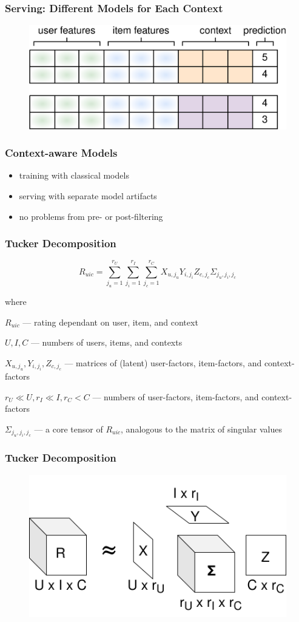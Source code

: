 \documentclass{beamer}
\begin{document}
\begin{frame}
  \frametitle{Serving: Different Models for Each Context}
  \begin{figure}
  \includegraphics[scale=0.25]{context-aware-3}
  \end{figure}
\end{frame}
\begin{frame}
  \frametitle{Context-aware Models}
  \begin{itemize}
  \item training with classical models
  \item serving with separate model artifacts
  \item no problems from pre- or post-filtering
  \end{itemize}
\end{frame}
\begin{frame}
  \frametitle{Tucker Decomposition}
$$R_{uic}=\sum\limits_{j_u=1}^{r_U}\sum\limits_{j_i=1}^{r_I}\sum\limits_{j_c=1}^{r_C}X_{u,j_u}Y_{i,j_i}Z_{c,j_c}\Sigma_{j_u,j_i,j_c}$$
  
  where

  $R_{uic}$ --- rating dependant on user, item, and context

  $U,I,C$ --- numbers of users, items, and contexts
  
  $X_{u,j_u},Y_{i,j_i},Z_{c,j_c}$ --- matrices of (latent) user-factors, item-factors, and context-factors

  $r_U\ll U,r_I\ll I,r_C<C$ --- numbers of user-factors, item-factors, and context-factors

  $\Sigma_{j_u,j_i,j_c}$ --- a core tensor of $R_{uic}$, analogous to the matrix of singular values
\end{frame}
\begin{frame}
  \frametitle{Tucker Decomposition}
  \begin{figure}
  \includegraphics[scale=0.3]{tucker}
  \end{figure}
\end{frame}
\end{document}
